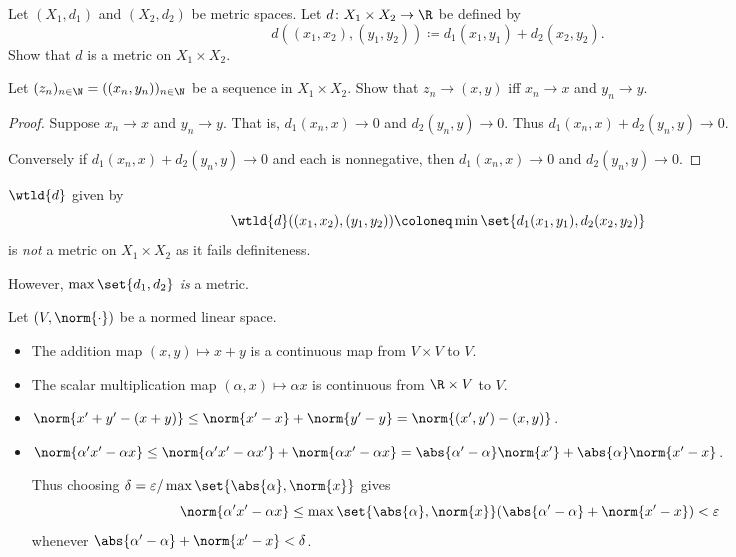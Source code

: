 \begin{exercise}
    Let $(X_1, d_1)$ and $(X_2, d_2)$ be metric spaces.
    Let $d\colon X_1 \times X_2 \to \R$ be defined by \[
        d((x_1, x_2), (y_1, y_2)) \coloneq d_1(x_1, y_1) + d_2(x_2, y_2).
    \] Show that $d$ is a metric on $X_1 \times X_2$.

    Let $(z_n)_{n \in \N} = ((x_n, y_n))_{n \in \N}$ be a sequence in
    $X_1 \times X_2$.
    Show that $z_n \to (x, y)$ iff $x_n \to x$ and $y_n \to y$.
\end{exercise}
\begin{proof}
    Suppose $x_n \to x$ and $y_n \to y$.
    That is, $d_1(x_n, x) \to 0$ and $d_2(y_n, y) \to 0$.
    Thus $d_1(x_n, x) + d_2(y_n, y) \to 0$.

    Conversely if $d_1(x_n, x) + d_2(y_n, y) \to 0$ and each is nonnegative,
    then $d_1(x_n, x) \to 0$ and $d_2(y_n, y) \to 0$.
\end{proof}

\begin{remark}
    $\wtld{d}$ given by \[
        \wtld{d}((x_1, x_2), (y_1, y_2)) \coloneq
            \min\set{d_1(x_1, y_1), d_2(x_2, y_2)}
    \] is \emph{not} a metric on $X_1 \times X_2$ as it fails definiteness.

    However, $\max\set{d_1, d_2}$ \emph{is} a metric.
\end{remark}

\begin{exercise}
    Let $(V, \norm{\cdot})$ be a normed linear space.
    \begin{itemize}
        \item The addition map $(x, y) \mapsto x + y$ is a continuous map
        from $V \times V$ to $V$.
        \item The scalar multiplication map $(\alpha, x) \mapsto \alpha x$
        is continuous from $\R \times V$ to $V$.
    \end{itemize}
\end{exercise}
\begin{solution} \leavevmode
    \begin{itemize}
        \item $\norm{x' + y' - (x + y)} \le \norm{x' - x} + \norm{y' - y}
        = \norm{(x', y') - (x, y)}$.
        \item $\norm{\alpha' x' - \alpha x} \le \norm{\alpha' x' - \alpha x'}
        + \norm{\alpha x' - \alpha x} = \abs{\alpha' - \alpha} \norm{x'}
        + \abs{\alpha} \norm{x' - x}$.

        Thus choosing $\delta = \varepsilon / \max\set{\abs{\alpha}, \norm{x}}$
        gives \[
            \norm{\alpha' x' - \alpha x} \le \max\set{\abs{\alpha}, \norm{x}}
                (\abs{\alpha' - \alpha} + \norm{x' - x}) < \varepsilon
        \] whenever $\abs{\alpha' - \alpha} + \norm{x' - x} < \delta$. \qedhere
    \end{itemize}
\end{solution}

